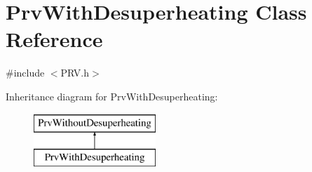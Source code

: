 \hypertarget{class_prv_with_desuperheating}{}\section{Prv\+With\+Desuperheating Class Reference}
\label{class_prv_with_desuperheating}


{\ttfamily \#include $<$P\+R\+V.\+h$>$}

Inheritance diagram for Prv\+With\+Desuperheating\+:\begin{figure}[H]
\begin{center}
\leavevmode
\includegraphics[height=2.000000cm]{d6/d6a/class_prv_with_desuperheating}
\end{center}
\end{figure}
